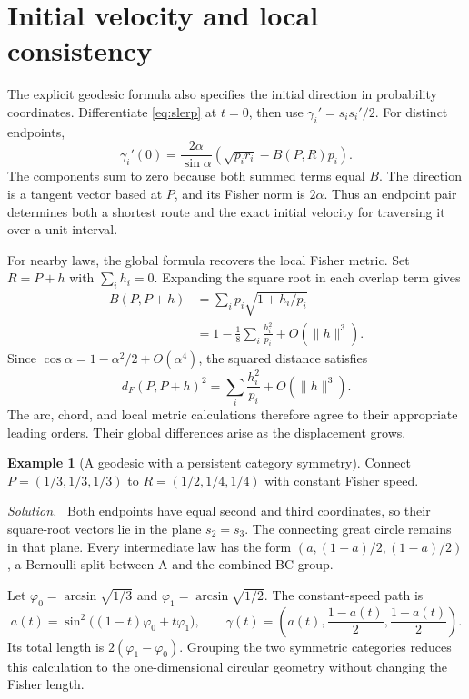 \documentclass[11pt,oneside,openany]{book}
\theoremstyle{definition}
\newtheorem{example}{Example}[chapter]
\theoremstyle{remark}
\newenvironment{solution}{\par\smallskip\noindent\textit{Solution.}\ }{\par\smallskip}
\numberwithin{equation}{chapter}
\begin{document}
\section{Initial velocity and local consistency}
The explicit geodesic formula also specifies the initial direction in probability coordinates. Differentiate \eqref{eq:slerp} at $t=0$, then use $\gamma_i'=s_i s_i'/2$. For distinct endpoints,
\begin{equation}\label{eq:geodesicinitial}
\gamma_i'(0)=\frac{2\alpha}{\sin\alpha}
\left(\sqrt{p_ir_i}-B(P,R)p_i\right).
\end{equation}
The components sum to zero because both summed terms equal $B$. The direction is a tangent vector based at $P$, and its Fisher norm is $2\alpha$. Thus an endpoint pair determines both a shortest route and the exact initial velocity for traversing it over a unit interval.

For nearby laws, the global formula recovers the local Fisher metric. Set $R=P+h$ with $\sum_i h_i=0$. Expanding the square root in each overlap term gives
\begin{align*}
B(P,P+h)
&=\sum_i p_i\sqrt{1+h_i/p_i}\\
&=1-\frac18\sum_i\frac{h_i^2}{p_i}+O(\|h\|^3).
\end{align*}
Since $\cos\alpha=1-\alpha^2/2+O(\alpha^4)$, the squared distance satisfies
\[
d_F(P,P+h)^2=\sum_i\frac{h_i^2}{p_i}+O(\|h\|^3).
\]
The arc, chord, and local metric calculations therefore agree to their appropriate leading orders. Their global differences arise as the displacement grows.

\begin{example}[A geodesic with a persistent category symmetry]
Connect $P=(1/3,1/3,1/3)$ to $R=(1/2,1/4,1/4)$ with constant Fisher speed.
\begin{solution}
Both endpoints have equal second and third coordinates, so their square-root vectors lie in the plane $s_2=s_3$. The connecting great circle remains in that plane. Every intermediate law has the form $(a,(1-a)/2,(1-a)/2)$, a Bernoulli split between A and the combined BC group.

Let $\varphi_0=\arcsin\sqrt{1/3}$ and $\varphi_1=\arcsin\sqrt{1/2}$. The constant-speed path is
\[
a(t)=\sin^2\bigl((1-t)\varphi_0+t\varphi_1\bigr),\qquad
\gamma(t)=\left(a(t),\frac{1-a(t)}2,\frac{1-a(t)}2\right).
\]
Its total length is $2(\varphi_1-\varphi_0)$. Grouping the two symmetric categories reduces this calculation to the one-dimensional circular geometry without changing the Fisher length.
\end{solution}
\end{example}
\end{document}
